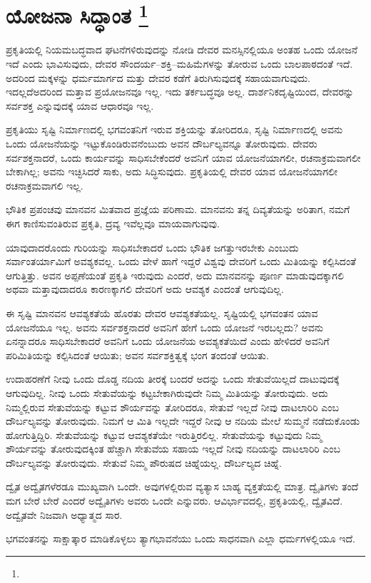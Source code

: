 
\chapter[ಯೋಜನಾ ಸಿದ್ಧಾಂತ ]{ಯೋಜನಾ ಸಿದ್ಧಾಂತ \protect\footnote{}}

ಪ್ರಕೃತಿಯಲ್ಲಿ ನಿಯಮಬದ್ಧವಾದ ಘಟನೆಗಳಿರುವುದನ್ನು ನೋಡಿ ದೇವರ ಮನಸ್ಸಿನಲ್ಲಿಯೂ ಅಂತಹ ಒಂದು ಯೋಜನೆ ಇದೆ ಎಂದು ಭಾವಿಸುವುದು, ದೇವರ ಸೌಂದರ್ಯ–ಶಕ್ತಿ–ಮಹಿಮೆಗಳನ್ನು ತೋರುವ ಒಂದು ಬಾಲಪಾಠದಂತೆ ಇದೆ. ಅದರಿಂದ ಮಕ್ಕಳನ್ನು ಧರ್ಮಮಾರ್ಗದ ಮತ್ತು ದೇವರ ಕಡೆಗೆ ತಿರುಗಿಸುವುದಕ್ಕೆ ಸಹಾಯವಾಗುವುದು. ಇದಲ್ಲದೆ\break ಅದರಿಂದ ಮತ್ತಾವ ಪ್ರಯೋಜನವೂ ಇಲ್ಲ. ಇದು ತರ್ಕಬದ್ಧವೂ ಅಲ್ಲ. ದಾರ್ಶನಿಕ\break ದೃಷ್ಟಿಯಿಂದ, ದೇವರನ್ನು ಸರ್ವಶಕ್ತ ಎನ್ನುವುದಕ್ಕೆ ಯಾವ ಆಧಾರವೂ ಇಲ್ಲ.

ಪ್ರಕೃತಿಯು ಸೃಷ್ಟಿ ನಿರ್ಮಾಣದಲ್ಲಿ ಭಗವಂತನಿಗೆ ಇರುವ ಶಕ್ತಿಯನ್ನು ತೋರಿದರೂ, ಸೃಷ್ಟಿ ನಿರ್ಮಾಣದಲ್ಲಿ ಅವನು ಒಂದು ಯೋಜನೆಯನ್ನು ಇಟ್ಟುಕೊಂಡಿರುವನೆಂಬುದು ಅವನ ದೌರ್ಬಲ್ಯವನ್ನೂ ತೋರುವುದು. ದೇವರು ಸರ್ವಶಕ್ತನಾದರೆ, ಒಂದು ಕಾರ್ಯವನ್ನು ಸಾಧಿಸಬೇಕೆಂದರೆ ಅವನಿಗೆ ಯಾವ ಯೋಜನೆಯಾಗಲೀ, ರಚನಾಕ್ರಮವಾಗಲೀ ಬೇಕಾಗಿಲ್ಲ; ಅವನು ಇಚ್ಛಿಸಿದರೆ ಸಾಕು, ಅದು ಸಿದ್ಧಿಸುವುದು. ಪ್ರಕೃತಿಯಲ್ಲಿ ದೇವರ ಯಾವ ಯೋಜನೆಯಾಗಲೀ ರಚನಾಕ್ರಮವಾಗಲಿ ಇಲ್ಲ.

ಭೌತಿಕ ಪ್ರಪಂಚವು ಮಾನವನ ಮಿತವಾದ ಪ್ರಜ್ಞೆಯ ಪರಿಣಾಮ. ಮಾನವನು ತನ್ನ ದಿವ್ಯತೆಯನ್ನು ಅರಿತಾಗ, ನಮಗೆ ಈಗ ಕಾಣಿಸುವಂತಿರುವ ಪ್ರಕೃತಿ, ದ್ರವ್ಯ ಇವೆಲ್ಲವೂ ಮಾಯವಾಗುವುವು.

ಯಾವುದಾದರೊಂದು ಗುರಿಯನ್ನು ಸಾಧಿಸಬೇಕಾದರೆ ಒಂದು ಭೌತಿಕ ಜಗತ್ತು\break ಇರಬೇಕು ಎಂಬುದು ಸರ್ವಾಂತರ್ಯಾಮಿಗೆ ಅವಶ್ಯಕವಲ್ಲ. ಒಂದು ವೇಳೆ ಹಾಗೆ ಇದ್ದರೆ ವಿಶ್ವವು ದೇವರಿಗೆ ಒಂದು ಮಿತಿಯನ್ನು ಕಲ್ಪಿಸಿದಂತೆ ಆಗುತ್ತಿತ್ತು. ಅವನ ಅಪ್ಪಣೆಯಂತೆ ಪ್ರಕೃತಿ ಇರುವುದು ಎಂದರೆ, ಅದು ಮಾನವನನ್ನು ಪೂರ್ಣ ಮಾಡುವುದಕ್ಕಾಗಲಿ ಅಥವಾ ಮತ್ತಾವುದಾದರೂ ಕಾರಣಕ್ಕಾಗಲಿ ದೇವರಿಗೆ ಅದು ಆವಶ್ಯಕ ಎಂದಂತೆ ಆಗುವುದಿಲ್ಲ.

ಈ ಸೃಷ್ಟಿ ಮಾನವನ ಆವಶ್ಯಕತೆಯೆ ಹೊರತು ದೇವರ ಆವಶ್ಯಕತೆಯಲ್ಲ. ಸೃಷ್ಟಿಯಲ್ಲಿ ಭಗವಂತನ ಯಾವ ಯೋಜನೆಯೂ ಇಲ್ಲ. ಅವನು ಸರ್ವಶಕ್ತನಾದರೆ ಅವನಿಗೆ ಹೇಗೆ ಒಂದು ಯೋಜನೆ ಇರಬಲ್ಲದು? ಅವನು ಏನನ್ನಾದರೂ ಸಾಧಿಸಬೇಕಾದರೆ ಅವನಿಗೆ ಒಂದು ಯೋಜನೆಯ ಅವಶ್ಯಕತೆಯಿದೆ ಎಂದು ಹೇಳಿದರೆ ಅವನಿಗೆ ಪರಿಮಿತಿಯನ್ನು ಕಲ್ಪಿಸಿದಂತೆ ಆಯಿತು; ಅವನ ಸರ್ವಶಕ್ತಿತ್ವಕ್ಕೆ ಭಂಗ ತಂದಂತೆ ಆಯಿತು.

\eject

ಉದಾಹರಣೆಗೆ ನೀವು ಒಂದು ದೊಡ್ಡ ನದಿಯ ತೀರಕ್ಕೆ ಬಂದರೆ ಅದನ್ನು ಒಂದು ಸೇತುವೆಯಿಲ್ಲದೆ ದಾಟುವುದಕ್ಕೆ ಆಗುವುದಿಲ್ಲ. ನೀವು ಒಂದು ಸೇತುವೆಯನ್ನು ಕಟ್ಟಬೇಕಾಗಿರುವುದೇ ನಿಮ್ಮ ಮಿತಿಯನ್ನು ತೋರುವುದು. ಅದು ನಿಮ್ಮಲ್ಲಿರುವ ಸೇತುವೆಯನ್ನು ಕಟ್ಟುವ ಶೌರ್ಯವನ್ನು ತೋರಿದರೂ, ಸೇತುವೆ ಇಲ್ಲದೆ ನೀವು ದಾಟಲಾರಿರಿ ಎಂಬ ದೌರ್ಬಲ್ಯವನ್ನು ತೋರುವುದು. ನಿಮಗೆ ಆ ಮಿತಿ ಇಲ್ಲದೇ ಇದ್ದರೆ ನೀವು ಆ ನದಿಯ ಮೇಲೆ ಸುಮ್ಮನೆ ನಡೆದುಕೊಂಡು ಹೋಗುತ್ತಿದ್ದಿರಿ. ಸೇತುವೆಯನ್ನು ಕಟ್ಟುವ ಆವಶ್ಯಕತೆಯೇ ಇರುತ್ತಿರಲಿಲ್ಲ. ಸೇತುವೆಯನ್ನು ಕಟ್ಟುವುದು ನಿಮ್ಮ ಶೌರ್ಯವನ್ನು ತೋರುವುದಕ್ಕಿಂತ ಹೆಚ್ಚಾಗಿ ಸೇತುವೆಯ ಸಹಾಯ ಇಲ್ಲದೆ ನೀವು ನದಿಯನ್ನು ದಾಟಲಾರಿರಿ ಎಂಬ ದೌರ್ಬಲ್ಯವನ್ನು ತೋರುವುದು. ಸೇತುವೆ ನಿಮ್ಮ ಪೌರುಷದ ಚಿಹ್ನೆಯಲ್ಲ. ದೌರ್ಬಲ್ಯದ ಚಿಹ್ನೆ.

ದ್ವೈತ ಅದ್ವೈತಗಳೆರಡೂ ಮುಖ್ಯವಾಗಿ ಒಂದೇ. ಅವುಗಳಲ್ಲಿರುವ ವ್ಯತ್ಯಾಸ ಬಾಹ್ಯ ವ್ಯಕ್ತತೆಯಲ್ಲಿ ಮಾತ್ರ. ದ್ವೈತಿಗಳು ತಂದೆ ಮಗ ಬೇರೆ ಬೇರೆ ಎಂದರೆ ಅದ್ವೈತಿಗಳು ಅವರು ಒಂದೇ ಎನ್ನುವರು. ಆವಿರ್ಭಾವದಲ್ಲಿ, ಪ್ರಕೃತಿಯಲ್ಲಿ, ದ್ವೈತವಿದೆ. ಅದ್ವೈತವೇ ನಿಜವಾಗಿ ಅಧ್ಯಾತ್ಮದ ಸಾರ.

ಭಗವಂತನನ್ನು ಸಾಕ್ಷಾತ್ಕಾರ ಮಾಡಿಕೊಳ್ಳಲು ತ್ಯಾಗಭಾವನೆಯು ಒಂದು ಸಾಧನವಾಗಿ ಎಲ್ಲಾ ಧರ್ಮಗಳಲ್ಲಿಯೂ ಇದೆ.

